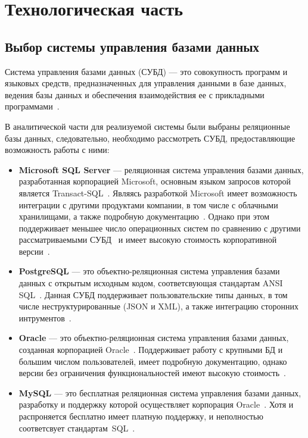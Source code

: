 \chapter{Технологическая часть}

\section{Выбор системы управления базами данных}

Система управления базами данных (СУБД) --- это совокупность программ и языковых
средств, предназначенных для управления данными в базе данных, ведения базы
данных и обеспечения взаимодействия ее с прикладными программами~\cite{gost01}.

В аналитической части для реализуемой системы были выбраны реляционные
базы данных, следовательно, необходимо рассмотреть СУБД, предоставляющие
возможность работы с ними:
\begin{itemize}
    \item \textbf{Microsoft SQL Server} --- реляционная система управления
        базами данных, разработанная корпорацией Microsoft, основным языком
        запросов которой является Transact-SQL~\cite{art06}. Являясь разработкой
        Microsoft имеет возможность интеграции с другими продуктами компании, в
        том числе с облачными хранилищами, а также подробную
        документацию~\cite{site10}. Однако при этом поддерживает меньшее число
        операционных систем по сравнению с другими рассматриваемыми
        СУБД~\cite{art07} и имеет высокую стоимость корпоративной
        версии~\cite{site11}.
    \item \textbf{PostgreSQL} --- это объектно-реляционная система управления
        базами данных с открытым исходным кодом, соответсвующая стандартам ANSI
        SQL~\cite{site08}.  Данная СУБД поддерживает пользовательские типы
        данных, в том числе неструктурированные (JSON и XML), а также интеграцию
        сторонних интрументов~\cite{site12}.
    \item \textbf{Oracle} --- это объектно-реляционная система управления базами
        данных, созданная корпорацией Oracle~\cite{site09}. Поддерживает работу
        с крупными БД и большим числом пользователей, имеет подробную
        документацию, однако версии без ограничения функциональностей имеют
        высокую стоимость~\cite{site13}.
    \item \textbf{MySQL} --- это бесплатная реляционная система управления
        базами данных, разработку и поддержку которой осуществляет корпорация
        Oracle~\cite{art06}.  Хотя и распроняется бесплатно имеет платную
        поддержку, и неполностью соответсвует стандартам~SQL~\cite{site12}.
\end{itemize}


